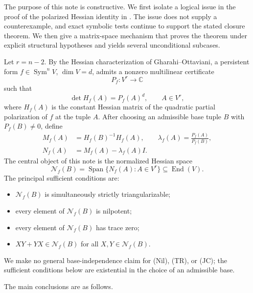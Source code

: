 \documentclass[11pt]{amsart}
\newcommand{\C}{\mathbb C}
\newcommand{\Sym}{\operatorname{Sym}}
\newcommand{\End}{\operatorname{End}}
\newcommand{\Span}{\operatorname{Span}}
\newcommand{\Nsp}{\mathcal N}
\begin{document}
The purpose of this note is constructive.  We first isolate a logical issue in
the proof of the polarized Hessian identity in \cite[Proposition~10]{G26}.
The issue does not supply a counterexample, and exact symbolic tests continue
to support the stated closure theorem.  We then give a matrix-space mechanism
that proves the theorem under explicit structural hypotheses and yields several
unconditional subcases.

Let $r=n-2$.  By the Hessian characterization of Gharahi--Ottaviani, a
persistent form $f\in\Sym^n V$, $\dim V=d$, admits a nonzero multilinear
certificate
\[
 P_f:V^r\longrightarrow \C
\]
such that
\begin{equation}\label{eq:certificate-intro}
 \det H_f(A)=P_f(A)^d,\qquad A\in V^r,
\end{equation}
where $H_f(A)$ is the constant Hessian matrix of the quadratic partial
polarization of $f$ at the tuple $A$.
After choosing an admissible base tuple $B$ with $P_f(B)\neq0$, define
\[
\begin{aligned}
 M_f(A)&=H_f(B)^{-1}H_f(A),\qquad
 \lambda_f(A)=\frac{P_f(A)}{P_f(B)},\\
 N_f(A)&=M_f(A)-\lambda_f(A)I.
\end{aligned}
\]
The central object of this note is the normalized Hessian space
\[
 \Nsp_f(B)=\Span\{N_f(A):A\in V^r\}\subseteq\End(V).
\]
The principal sufficient conditions are:
\begin{itemize}[leftmargin=2em]
\item[(T)] $\Nsp_f(B)$ is simultaneously strictly triangularizable;
\item[(Nil)] every element of $\Nsp_f(B)$ is nilpotent;
\item[(TR)] every element of $\Nsp_f(B)$ has trace zero;
\item[(JC)] $XY+YX\in\Nsp_f(B)$ for all $X,Y\in\Nsp_f(B)$.
\end{itemize}
We make no general base-independence claim for (Nil), (TR), or (JC); the
sufficient conditions below are existential in the choice of an admissible
base.

The main conclusions are as follows.
\end{document}
